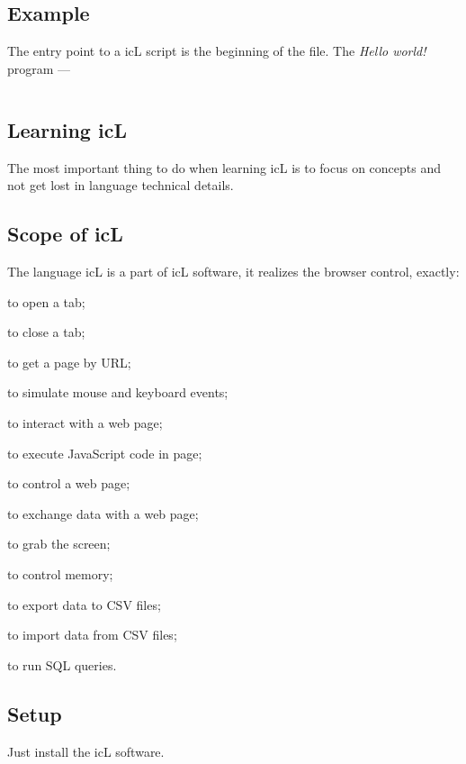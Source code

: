 \subsection{Example}

The entry point to a icL script is the beginning of the file. The \textit{Hello world!} program —
\inputminted[linenos]{icl}{../sources/helloworld.icL}

\subsection{Learning icL}

The most important thing to do when learning icL is to focus on concepts and not get lost in language technical details.

\subsection{Scope of icL}

The language icL is a part of icL software, it realizes the browser control, exactly:
\begin{icItems}
\item
	to open a tab;
\item
	to close a tab;
\item
	to get a page by URL;
\item
	to simulate mouse and keyboard events;
\item
	to interact with a web page;
\item
	to execute JavaScript code in page;
\item
	to control a web page;
\item
	to exchange data with a web page;
\item
	to grab the screen;
\item
	to control memory;
\item
	to export data to CSV files;
\item
	to import data from CSV files;
\item
	to run SQL queries.
\end{icItems}

\subsection{Setup}

Just install the icL software.
